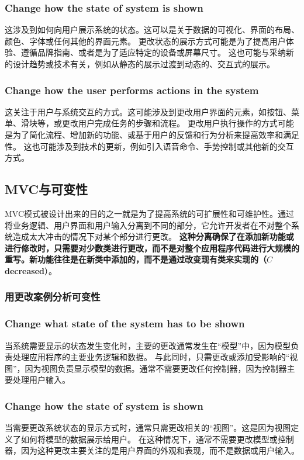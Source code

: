 \subsubsection{Change how the state of system is shown}
这涉及到如何向用户展示系统的状态。这可以是关于数据的可视化、界面的布局、颜色、字体或任何其他的界面元素。
更改状态的展示方式可能是为了提高用户体验、遵循品牌指南、或者是为了适应特定的设备或屏幕尺寸。
这也可能与采纳新的设计趋势或技术有关，例如从静态的展示过渡到动态的、交互式的展示。

\subsubsection{Change how the user performs actions in the system}
这关注于用户与系统交互的方式。这可能涉及到更改用户界面的元素，如按钮、菜单、滑块等，或更改用户完成任务的步骤和流程。
更改用户执行操作的方式可能是为了简化流程、增加新的功能、或基于用户的反馈和行为分析来提高效率和满足性。
这也可能涉及到技术的更新，例如引入语音命令、手势控制或其他新的交互方式。

\subsection{MVC与可变性}

MVC模式被设计出来的目的之一就是为了提高系统的可扩展性和可维护性。通过将业务逻辑、用户界面和用户输入分离到不同的部分，它允许开发者在不对整个系统造成太大冲击的情况下对某个部分进行更改。
\textbf{这种分离确保了在添加新功能或进行修改时，只需要对少数类进行更改，而不是对整个应用程序代码进行大规模的重写。新功能往往是在新类中添加的，而不是通过改变现有类来实现的（$C$ decreased}）。

\subsubsection{用更改案例分析可变性}

\subsubsection{Change what state of the system has to be shown}
当系统需要显示的状态发生变化时，主要的更改通常发生在“模型”中，因为模型负责处理应用程序的主要业务逻辑和数据。
与此同时，只需更改或添加受影响的“视图”，因为视图负责显示模型的数据。通常不需要更改任何控制器，因为控制器主要处理用户输入。
\subsubsection{Change how the state of system is shown}
当需要更改系统状态的显示方式时，通常只需更改相关的“视图”。这是因为视图定义了如何将模型的数据展示给用户。
在这种情况下，通常不需要更改模型或控制器，因为这种更改主要关注的是用户界面的外观和表现，而不是数据或用户输入。
